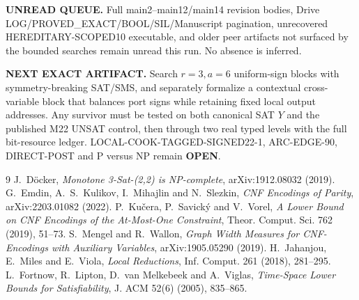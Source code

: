 \documentclass[11pt]{article}
\newcommand{\OPEN}{\textbf{OPEN}}
\begin{document}
\textbf{UNREAD QUEUE.} Full main2--main12/main14 revision bodies, Drive
LOG/PROVED\_EXACT/BOOL/SIL/Manuscript pagination, unrecovered
HEREDITARY-SCOPED10 executable, and older peer artifacts not surfaced by the
bounded searches remain unread this run.  No absence is inferred.

\textbf{NEXT EXACT ARTIFACT.} Search $r=3,a=6$ uniform-sign blocks with
symmetry-breaking SAT/SMS, and separately formalize a contextual cross-variable
block that balances port signs while retaining fixed local output addresses.
Any survivor must be tested on both canonical SAT $Y$ and the published M22
UNSAT control, then through two real typed levels with the full bit-resource
ledger.  LOCAL-COOK-TAGGED-SIGNED22-1, ARC-EDGE-90, DIRECT-POST and P versus NP
remain \OPEN{}.

\begin{thebibliography}{9}
 J.~D\"ocker, \emph{Monotone 3-Sat-(2,2) is NP-complete}, arXiv:1912.08032 (2019).
 G.~Emdin, A.~S.~Kulikov, I.~Mihajlin and N.~Slezkin, \emph{CNF Encodings of Parity}, arXiv:2203.01082 (2022).
 P.~Ku\v{c}era, P.~Savick\'y and V.~Vorel, \emph{A Lower Bound on CNF Encodings of the At-Most-One Constraint}, Theor. Comput. Sci. 762 (2019), 51--73.
 S.~Mengel and R.~Wallon, \emph{Graph Width Measures for CNF-Encodings with Auxiliary Variables}, arXiv:1905.05290 (2019).
 H.~Jahanjou, E.~Miles and E.~Viola, \emph{Local Reductions}, Inf. Comput. 261 (2018), 281--295.
 L.~Fortnow, R.~Lipton, D.~van Melkebeek and A.~Viglas, \emph{Time-Space Lower Bounds for Satisfiability}, J. ACM 52(6) (2005), 835--865.
\end{thebibliography}
\end{document}
